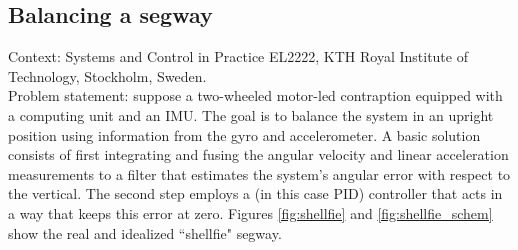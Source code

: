 \subsection{Balancing a segway}

Context: Systems and Control in Practice EL2222, KTH Royal Institute of
Technology, Stockholm, Sweden.\\

Problem statement: suppose a two-wheeled motor-led contraption equipped with a
computing unit and an IMU. The goal is to balance the system in an upright
position using information from the gyro and accelerometer. A basic solution
consists of first integrating and fusing the angular velocity and linear
acceleration measurements to a filter that estimates the system's angular error
with respect to the vertical. The second step employs a (in this case PID)
controller that acts in a way that keeps this error at zero. Figures
\ref{fig:shellfie} and \ref{fig:shellfie_schem} show the real and idealized
``shellfie" segway.

